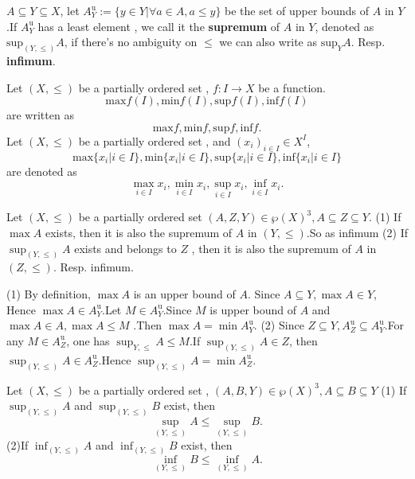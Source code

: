 \begin{definitionenv}
    $A\subseteq Y\subseteq X$, let $A_Y^\mathrm{u}:=\{y\in Y|\forall a\in A, a\le y\}$ be the set of upper bounds of $A$ in $Y$.If $A_Y^\mathrm{u}$ has a least element , we call it the \textbf{supremum} of $A$ in $Y$,  denoted as $\mathrm{sup}_{(Y, \le)}A$,  if there's no ambiguity on $\le$ we can also write as $\mathrm{sup}_{Y}A$. Resp. \textbf{infimum}.
\end{definitionenv}
\begin{notationenv}\label{notation4.5.1}
    
         Let $(X, \le)$ be a partially ordered set , $f:I\rightarrow X$ be a function.$$\mathrm{max}f(I), \mathrm{min}f(I), \mathrm{sup}f(I), \mathrm{inf}f(I)$$ are written as $$\mathrm{max}f, \mathrm{min}f, \mathrm{sup}f, \mathrm{inf}f.$$
         Let $(X, \le)$ be a partially ordered set , and $(x_i)_{i\in I}\in X^I$, $$\mathrm{max}\{x_i|i\in I\}, \mathrm{min}\{x_i|i\in I\}, \mathrm{sup}\{x_i|i\in I\}, \mathrm{inf}\{x_i|i\in I\}$$ are denoted as $$\max _{i\in I}x_i, \min _{i\in I}x_i, \sup _{i\in I}x_i, \inf _{i\in I}x_i.$$
    
\end{notationenv}
\begin{propositionenv}\label{proposition4.5.1}
    \quad
    \newline
    Let $(X, \le)$ be a partially ordered set $(A, Z, Y)\in \wp (X)^3, A\subseteq Z\subseteq Y$.
    \newline
   (1) If $\max A$ exists, then it is also the supremum of $A$ in $(Y, \le)$.So as infimum
    \newline
    (2) If $\sup_{(Y, \le)}A$ exists and belongs to $Z$ , then it is also the supremum of $A$ in $(Z, \le)$. Resp. infimum.
\end{propositionenv}
\begin{proofenv}
    \quad \newline
   (1) By definition, $\max A $ is an upper bound of $A$. Since $A\subseteq Y,  \max A \in Y$, Hence $\max A\in A_Y^\mathrm{u}$.Let $M\in A_Y^\mathrm{u} $.Since $M$ is upper bound of $A$ and $\max A\in A, \max A\le M$ .Then $\max A=\min A_Y^\mathrm{u}$.
\newline
(2) Since $Z\subseteq Y, A_Z^\mathrm{u}\subseteq A_Y^\mathrm{u}$.For any $M\in A_Z^\mathrm{u}$, one has $\sup _{Y, \le}A\le M$.If $\sup_{(Y, \le)}A\in Z$, then $\sup_{(Y, \le)}A\in A_Z^\mathrm{u}$.Hence $\sup _{(Y, \le)}A=\min A_Z^\mathrm{u}$.
\end{proofenv}
\begin{propositionenv}\label{proposition4.5.2}
    \quad
    \newline
    Let $(X, \le )$ be a partially ordered set , $(A, B, Y)\in \wp (X)^3, A\subseteq B\subseteq Y$
    \newline
    (1) If $\sup_{(Y, \le)}A$ and $\sup_{(Y, \le)}B$ exist,  then $$\sup_{(Y, \le)}A \le \sup_{(Y, \le)}B.$$
    \newline
    (2)If $\inf_{(Y, \le)}A$ and $\inf_{(Y, \le)}B$ exist,  then $$\inf_{(Y, \le)}B \le \inf_{(Y, \le)}A.$$
    
\end{propositionenv}
